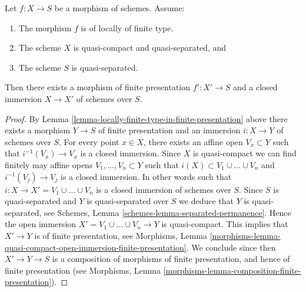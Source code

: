 \begin{lemma}
\label{lemma-finite-type-closed-in-finite-presentation}
Let $f : X \to S$ be a morphism of schemes.
Assume:
\begin{enumerate}
\item The morphism $f$ is of locally of finite type.
\item The scheme $X$ is quasi-compact and quasi-separated, and
\item The scheme $S$ is quasi-separated.
\end{enumerate}
Then there exists a morphism of finite presentation
$f' : X' \to S$ and a closed immersion $X \to X'$ of schemes over $S$.
\end{lemma}

\begin{proof}
By Lemma \ref{lemma-locally-finite-type-in-finite-presentation} above
there exists a morphism $Y \to S$ of finite presentation and an
immersion $i : X \to Y$ of schemes over $S$.
For every point $x \in X$, there exists an affine open
$V_x \subset Y$ such that $i^{-1}(V_x) \to V_x$ is a
closed immersion. Since $X$ is quasi-compact we can find
finitely may affine opens $V_1, \ldots, V_n \subset Y$
such that $i(X) \subset V_1 \cup \ldots \cup V_n$ and
$i^{-1}(V_j) \to V_j$ is a closed immersion. In other words
such that $i : X \to X' = V_1 \cup \ldots \cup V_n$ is a
closed immersion of schemes over $S$.
Since $S$ is quasi-separated and $Y$ is quasi-separated over $S$
we deduce that $Y$ is quasi-separated, see
Schemes, Lemma \ref{schemes-lemma-separated-permanence}.
Hence the open immersion $X' = V_1 \cup \ldots \cup V_n \to Y$
is quasi-compact. This implies that
$X' \to Y$ is of finite presentation, see
Morphisms,
Lemma \ref{morphisms-lemma-quasi-compact-open-immersion-finite-presentation}.
We conclude since then $X' \to Y \to S$ is a composition of morphisms
of finite presentation, and hence of finite presentation (see
Morphisms, Lemma \ref{morphisms-lemma-composition-finite-presentation}).
\end{proof}
